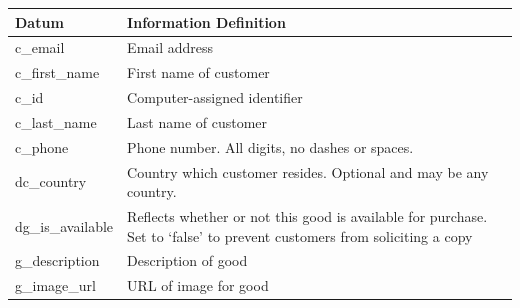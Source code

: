 \documentclass[11pt, a4paper]{report}
\begin{document}
\begin{longtable}{|l|p{10cm}|}

\hline
\textbf{Datum}          & \textbf{Information Definition}                                                                                                                                                \\ \hline
c\_email                & Email address                                                                                                                                                         \\ \hline
c\_first\_name          & First name of customer                                                                                                                                                \\ \hline
c\_id                   & Computer-assigned identifier                                                                                                                                          \\ \hline
c\_last\_name           & Last name of customer                                                                                                                                                 \\ \hline
c\_phone                & Phone number. All digits, no dashes or spaces.                                                                                                                        \\ \hline
dc\_country             & Country which customer resides. Optional and may be any country.                                                                                                      \\ \hline
dg\_is\_available       & Reflects whether or not this good is available for purchase. Set to `false' to prevent customers from soliciting a copy                                               \\ \hline
g\_description          & Description of good                                                                                                                                                   \\ \hline
g\_image\_url           & URL of image for good                                                                                                                                                 \\ \hline

\end{longtable}
\end{document}
